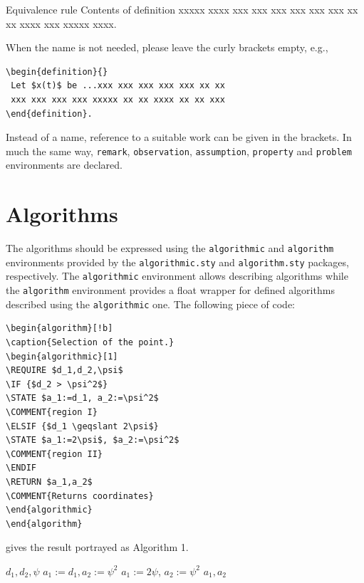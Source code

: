 \documentclass{amcs}
\begin{document}
\medskip
\begin{definition}{Equivalence rule}
 Contents of definition xxxxx xxxx xxx xxx
 xxx xxx xxx xxx xx xx xxxx xxx xxxxx xxxx.
 \label{definition1}
\end{definition}

\medskip\noindent
When the name is not needed, please leave the curly brackets empty, e.g.,

{\small \begin{verbatim}
\begin{definition}{}
 Let $x(t)$ be ...xxx xxx xxx xxx xxx xx xx
 xxx xxx xxx xxx xxxxx xx xx xxxx xx xx xxx
\end{definition}.
\end{verbatim}}

\noindent Instead of a name, reference to a suitable work can be given in the brackets. In much the same way, \verb+remark+, \verb+observation+, \verb+assumption+, \verb+property+ and \verb+problem+ environments are declared.

\section{Algorithms}
The algorithms should be expressed using the \verb+algorithmic+ and \verb+algorithm+ environments provided by the \verb+algorithmic.sty+ and \verb+algorithm.sty+ packages, respectively. The \verb+algorithmic+ environment allows describing algorithms while the \verb+algorithm+ environment provides a float wrapper for defined algorithms described using the \verb+algorithmic+ one. The following piece of code:
\begin{verbatim}
\begin{algorithm}[!b]
\caption{Selection of the point.}
\begin{algorithmic}[1]
\REQUIRE $d_1,d_2,\psi$
\IF {$d_2 > \psi^2$}
\STATE $a_1:=d_1, a_2:=\psi^2$
\COMMENT{region I}
\ELSIF {$d_1 \geqslant 2\psi$}
\STATE $a_1:=2\psi$, $a_2:=\psi^2$
\COMMENT{region II}
\ENDIF
\RETURN $a_1,a_2$
\COMMENT{Returns coordinates}
\end{algorithmic}
\end{algorithm}
\end{verbatim}
gives the result portrayed as Algorithm 1.
\begin{algorithm}[!b]
\caption{Selection of the stationary point.}
\label{a:alg}
\begin{algorithmic}[1]
\REQUIRE $d_1,d_2,\psi$
\STATE $a_1:=d_1, a_2:=\psi^2$
\STATE $a_1:=2\psi$, $a_2:=\psi^2$
\ENDIF
\RETURN $a_1,a_2$
\end{algorithmic}
\end{algorithm}
\end{document}
